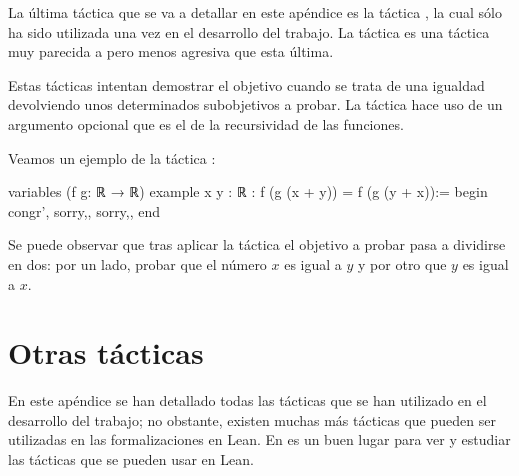 La última táctica que se va a detallar en este apéndice es la táctica
, la cual sólo ha sido utilizada una vez en el
desarrollo del trabajo. La táctica  es una
táctica muy parecida a  pero menos agresiva que
esta última.

Estas tácticas intentan demostrar el objetivo cuando se trata de una
igualdad devolviendo unos determinados subobjetivos a probar. La táctica
 hace uso de un argumento opcional que es el de
la recursividad de las funciones.

Veamos un ejemplo de la táctica :

\begin{leancode}
variables (f g: ℝ → ℝ)
example {x y : ℝ} : f (g (x + y)) = f (g (y + x)):=
begin
  congr',
  {sorry,},
  {sorry,},
end
\end{leancode}

Se puede observar que tras aplicar la táctica 
el objetivo a probar pasa a dividirse en dos: por un lado, probar que el
número \(x\) es igual a \(y\) y por otro que \(y\) es igual a \(x\).

\section{Otras tácticas}

En este apéndice se han detallado todas las tácticas que se han
utilizado en el desarrollo del trabajo; no obstante, existen muchas más
tácticas que pueden ser utilizadas en las formalizaciones en Lean. En
\cite{tactic} es un buen lugar para ver y estudiar las tácticas que se
pueden usar en Lean.
